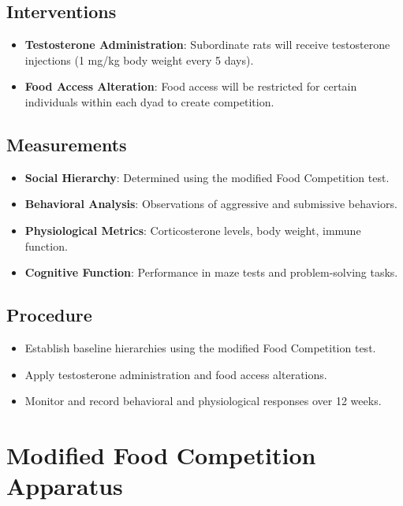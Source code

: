 \documentclass[english, a4paper, 11pt]{article}
\begin{document}
\subsection*{Interventions}
\begin{itemize}
    \item \textbf{Testosterone Administration}: Subordinate rats will receive testosterone injections (1 mg/kg body weight every 5 days).
    \item \textbf{Food Access Alteration}: Food access will be restricted for certain individuals within each dyad to create competition.
\end{itemize}

\subsection*{Measurements}
\begin{itemize}
    \item \textbf{Social Hierarchy}: Determined using the modified Food Competition test.
    \item \textbf{Behavioral Analysis}: Observations of aggressive and submissive behaviors.
    \item \textbf{Physiological Metrics}: Corticosterone levels, body weight, immune function.
    \item \textbf{Cognitive Function}: Performance in maze tests and problem-solving tasks.
\end{itemize}

\subsection*{Procedure}
\begin{itemize}
    \item Establish baseline hierarchies using the modified Food Competition test.
    \item Apply testosterone administration and food access alterations.
    \item Monitor and record behavioral and physiological responses over 12 weeks.
\end{itemize}

\section*{Modified Food Competition Apparatus}
\end{document}
